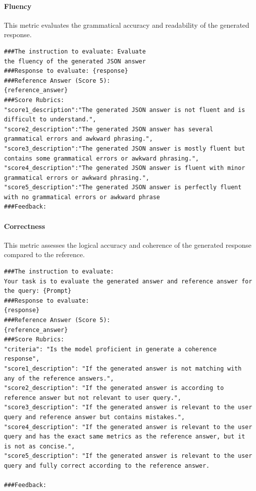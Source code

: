 \paragraph{Fluency}
This metric evaluates the grammatical accuracy and readability of the generated response.

\begin{lstlisting}[style=textstyle, frame = single, caption=Prompt structured fluency \citep{kim2024prometheus2opensource}, label=code:estructured-fluency]
###The instruction to evaluate: Evaluate 
the fluency of the generated JSON answer
###Response to evaluate: {response}
###Reference Answer (Score 5): 
{reference_answer}
###Score Rubrics:
"score1_description":"The generated JSON answer is not fluent and is difficult to understand.",
"score2_description":"The generated JSON answer has several grammatical errors and awkward phrasing.",
"score3_description":"The generated JSON answer is mostly fluent but contains some grammatical errors or awkward phrasing.",
"score4_description":"The generated JSON answer is fluent with minor grammatical errors or awkward phrasing.",
"score5_description":"The generated JSON answer is perfectly fluent with no grammatical errors or awkward phrase
###Feedback:
\end{lstlisting}

\paragraph{Correctness}
This metric assesses the logical accuracy and coherence of the generated response compared to the reference.

\begin{lstlisting}[style=textstyle, frame = single, caption=Prompt estructured correctness \citep{kim2024prometheus2opensource}, label=code:estructured-correctness]
###The instruction to evaluate:
Your task is to evaluate the generated answer and reference answer for the query: {Prompt}
###Response to evaluate:
{response}
###Reference Answer (Score 5):
{reference_answer}
###Score Rubrics:
"criteria": "Is the model proficient in generate a coherence response",
"score1_description": "If the generated answer is not matching with any of the reference answers.",
"score2_description": "If the generated answer is according to reference answer but not relevant to user query.",
"score3_description": "If the generated answer is relevant to the user query and reference answer but contains mistakes.",
"score4_description": "If the generated answer is relevant to the user query and has the exact same metrics as the reference answer, but it is not as concise.",
"score5_description": "If the generated answer is relevant to the user query and fully correct according to the reference answer.

###Feedback: 
\end{lstlisting}

